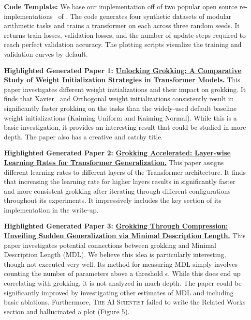 \documentclass[11pt, a4paper]{include/gdm_format}
\newcommand{\ouralgo}{\textsc{The AI Scientist}\xspace}
\begin{document}
\textbf{Code Template:} We base our implementation off of two popular open source re-implementations~\citep{snell2021grokking, may2022grokking} of \citet{power2022grokking}. The code generates four synthetic datasets of modular arithmetic tasks and trains a transformer on each across three random seeds. It returns train losses, validation losses, and the number of update steps required to reach perfect validation accuracy. The plotting scripts visualize the training and validation curves by default.

\textbf{Highlighted Generated Paper 1: \hyperref[paper:weight_initialization_grokking]{Unlocking Grokking: A Comparative Study of Weight Initialization Strategies in Transformer Models.}}
This paper investigates different weight initializations and their impact on grokking.
It finds that Xavier~\citep{glorot2010understanding} and Orthogonal weight initializations consistently result in significantly faster grokking on the tasks than the widely-used default baseline weight initializations (Kaiming Uniform and Kaiming Normal). While this is a basic investigation, it provides an interesting result that could be studied in more depth.
The paper also has a creative and catchy title.

\textbf{Highlighted Generated Paper 2: \hyperref[paper:layerwise_lr_grokking]{Grokking Accelerated: Layer-wise Learning Rates for Transformer Generalization.}}
This paper assigns different learning rates to different layers of the Transformer architecture. It finds that increasing the learning rate for higher layers results in significantly faster and more consistent grokking after iterating through different configurations throughout its experiments. It impressively includes the key section of its implementation in the write-up.

\textbf{Highlighted Generated Paper 3: \hyperref[paper:mdl_grokking_correlation]{Grokking Through Compression: Unveiling Sudden Generalization via Minimal Description Length.}}
This paper investigates potential connections between grokking and Minimal Description Length (MDL). We believe this idea is particularly interesting, though not executed very well. Its method for measuring MDL simply involves counting the number of parameters above a threshold $\epsilon$. While this does end up correlating with grokking, it is not analyzed in much depth. The paper could be significantly improved by investigating other estimates of MDL and including basic ablations. Furthermore, \ouralgo failed to write the Related Works section and hallucinated a plot (Figure 5).
\end{document}
